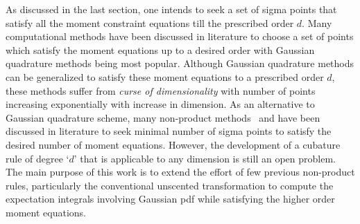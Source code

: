 \documentclass[letterpaper, 10 pt, conference]{IEEEtran}  %
\begin{document}
As discussed in the last section, one intends to seek a set of sigma points that satisfy all the moment constraint equations till the prescribed order $d$.  Many computational methods have been discussed in literature to choose a set of points which satisfy the moment equations up to a desired order with Gaussian quadrature methods being most popular. Although Gaussian quadrature methods can be generalized to satisfy these moment equations to a prescribed order $d$, these methods suffer from \textit{curse of dimensionality} with number of points increasing exponentially with increase in dimension. As an alternative to Gaussian quadrature scheme, many non-product methods~\cite{str2d,phil2D,Robd92D,Richd72D,jul1,Arackf,str5d} and \cite{str7d} have been discussed in literature to seek minimal number of sigma points to satisfy the desired number of moment equations. However, the development of a cubature rule of degree `$d$' that is applicable to any dimension is still an open problem.%
The main purpose of this work is to extend the effort of few previous non-product rules, particularly the conventional unscented transformation to compute the expectation integrals involving Gaussian pdf  while satisfying the higher order moment equations.  
\end{document}
